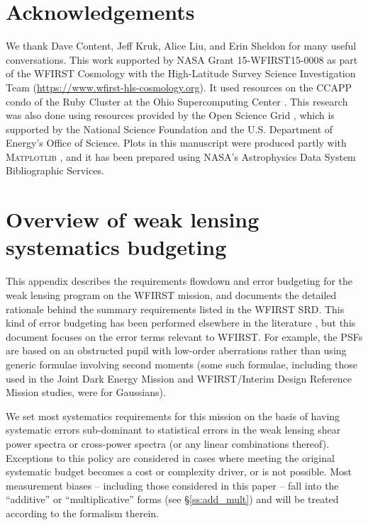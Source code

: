 \documentclass[usenatbib]{mnras}
\begin{document}
\section*{Acknowledgements}

We thank Dave Content, Jeff Kruk, Alice Liu, and Erin Sheldon for many useful conversations. 
This work supported by NASA Grant 15-WFIRST15-0008 as part of the WFIRST Cosmology with the High-Latitude Survey Science Investigation Team (\url{https://www.wfirst-hls-cosmology.org}). 
It used resources on the CCAPP condo of the Ruby Cluster at the Ohio Supercomputing Center \citep{OhioSupercomputerCenter1987}. This research was also done using resources provided by the Open Science Grid \citep{Pordes2008,Sfiligoi2009}, which is supported by the National Science Foundation and the U.S. Department of Energy's Office of Science. Plots in this manuscript were produced partly with \textsc{Matplotlib} \citep{Hunter:2007}, and it has been prepared using NASA's Astrophysics Data System Bibliographic Services.




\appendix


\section{Overview of weak lensing systematics budgeting}
\label{app:wl-budget}

This appendix describes the requirements flowdown and error budgeting
for the weak lensing program on the WFIRST mission, and documents the
detailed rationale behind the summary requirements listed in the
WFIRST SRD. This kind of error budgeting has been performed elsewhere
in the literature \citep{2008A&A...484...67P,2013MNRAS.429..661M}, but
this document focuses on the error terms relevant to WFIRST. For
example, the PSFs are based on an obstructed pupil with low-order
aberrations rather than using generic formulae involving second
moments (some such formulae, including those used in the Joint Dark Energy Mission and
WFIRST/Interim Design Reference Mission studies, were for Gaussians).

We set most systematics requirements for this mission on the basis of
having systematic errors sub-dominant to statistical errors in the weak lensing
shear power spectra or cross-power spectra (or any linear combinations
thereof). Exceptions to this policy are considered in cases
where meeting the original systematic budget becomes a cost or
complexity driver, or is not possible. Most measurement biases -- including those considered in this paper -- fall
into the ``additive'' or ``multiplicative'' forms (see
\S\ref{ss:add_mult}) and will be treated according to the formalism
therein.
\end{document}
